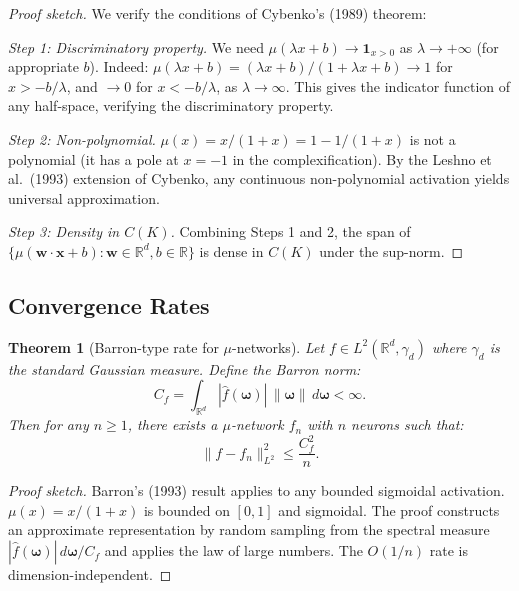 \documentclass[11pt]{article}
\newtheorem{theorem}{Theorem}[section]
\theoremstyle{definition}
\theoremstyle{remark}
\begin{document}
\begin{proof}[Proof sketch]
We verify the conditions of Cybenko's (1989) theorem:

\emph{Step 1: Discriminatory property.}
We need $\mu(\lambda x + b) \to \mathbf{1}_{x > 0}$ as
$\lambda \to +\infty$ (for appropriate $b$). Indeed:
$\mu(\lambda x + b) = (\lambda x + b)/(1 + \lambda x + b)
\to 1$ for $x > -b/\lambda$, and $\to 0$ for
$x < -b/\lambda$, as $\lambda \to \infty$. This gives the
indicator function of any half-space, verifying the
discriminatory property.

\emph{Step 2: Non-polynomial.}
$\mu(x) = x/(1+x) = 1 - 1/(1+x)$ is not a polynomial
(it has a pole at $x = -1$ in the complexification).
By the Leshno et al.\ (1993) extension of Cybenko, any
continuous non-polynomial activation yields universal
approximation.

\emph{Step 3: Density in $C(K)$.}
Combining Steps 1 and 2, the span of
$\{\mu(\mathbf{w} \cdot \mathbf{x} + b) :
\mathbf{w} \in \mathbb{R}^d, b \in \mathbb{R}\}$
is dense in $C(K)$ under the sup-norm. \qedhere
\end{proof}

\subsection{Convergence Rates}

\begin{theorem}[Barron-type rate for $\mu$-networks]
\label{thm:barron}
Let $f \in L^2(\mathbb{R}^d, \gamma_d)$ where $\gamma_d$ is
the standard Gaussian measure. Define the Barron norm:
\begin{equation}
  C_f = \int_{\mathbb{R}^d} |\hat{f}(\boldsymbol{\omega})|
  \,\|\boldsymbol{\omega}\|\,d\boldsymbol{\omega} < \infty.
  \label{eq:barron-norm}
\end{equation}
Then for any $n \geq 1$, there exists a $\mu$-network $f_n$
with $n$ neurons such that:
\begin{equation}
  \|f - f_n\|_{L^2}^2 \leq \frac{C_f^2}{n}.
  \label{eq:barron-rate}
\end{equation}
\end{theorem}

\begin{proof}[Proof sketch]
Barron's (1993) result applies to any bounded sigmoidal
activation. $\mu(x) = x/(1+x)$ is bounded on $[0,1]$
and sigmoidal. The proof constructs an approximate
representation by random sampling from the spectral
measure $|\hat{f}(\boldsymbol{\omega})|\,d\boldsymbol{\omega}
/ C_f$ and applies the law of large numbers. The $O(1/n)$
rate is dimension-independent.
\end{proof}
\end{document}
